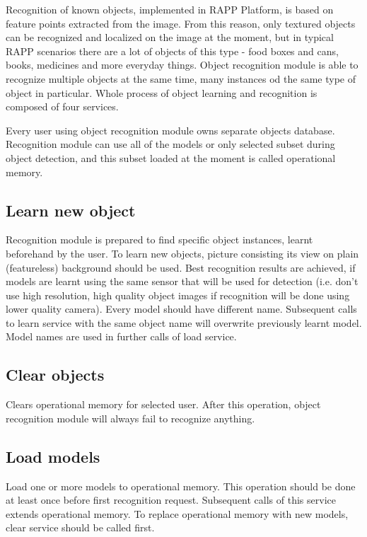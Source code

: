 Recognition of known objects, implemented in R\-A\-P\-P Platform, is based on feature points extracted from the image. From this reason, only textured objects can be recognized and localized on the image at the moment, but in typical R\-A\-P\-P scenarios there are a lot of objects of this type -\/ food boxes and cans, books, medicines and more everyday things. Object recognition module is able to recognize multiple objects at the same time, many instances od the same type of object in particular. Whole process of object learning and recognition is composed of four services.

Every user using object recognition module owns separate objects database. Recognition module can use all of the models or only selected subset during object detection, and this subset loaded at the moment is called operational memory.

\subsection*{Learn new object}

Recognition module is prepared to find specific object instances, learnt beforehand by the user. To learn new objects, picture consisting its view on plain (featureless) background should be used. Best recognition results are achieved, if models are learnt using the same sensor that will be used for detection (i.\-e. don't use high resolution, high quality object images if recognition will be done using lower quality camera). Every model should have different name. Subsequent calls to learn service with the same object name will overwrite previously learnt model. Model names are used in further calls of load service.

\subsection*{Clear objects}

Clears operational memory for selected user. After this operation, object recognition module will always fail to recognize anything.

\subsection*{Load models}

Load one or more models to operational memory. This operation should be done at least once before first recognition request. Subsequent calls of this service extends operational memory. To replace operational memory with new models, clear service should be called first.

